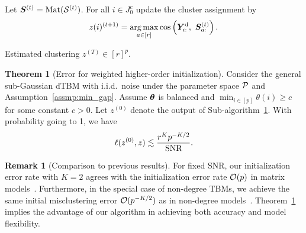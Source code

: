 \documentclass[lettersize,onecolumn,journal]{IEEEtran}
\theoremstyle{definition}
\newtheorem{thm}{Theorem}
\theoremstyle{definition}
\newtheorem{rmk}{Remark}
\newcommand{\of}[1]{\left(#1\right)}
\def\fixme#1#2{\textbf{\color{red}[FIXME (#1): #2]}}
\begin{document}
\begin{algorithm}[h!]
\begin{algorithmic}[1]
\State Let $\bm S^{(t)} = \text{Mat}(\mathcal{S}^{(t)})$. For all $i \in J_0^c$ update the cluster assignment by
\begin{equation}
    z(i)^{(t+1)} = \operatorname*{arg\,max}_{a \in [r]} \cos \left( \bm Y^{\text{d}}_{i:},\ \bm S^{(t)}_{a:} \right).
\end{equation}

\EndFor

\OUTPUT Estimated clustering $z^{(T)}  \in [r]^{p}$.

\end{algorithmic}
\end{algorithm}


\begin{thm}[Error for weighted higher-order initialization]\label{thm:initial} Consider the general {\color{blue} sub-Gaussian} dTBM {\color{blue} with i.i.d.\ noise} under the parameter space $\mathcal{P}$ and Assumption~\ref{assmp:min_gap}. 
Assume $\boldsymbol{\theta}$ is balanced and $\min_{i\in[p]}\theta(i) \geq c$ for some constant $c>0$. Let $ z^{(0)}$ denote the output of Sub-algorithm~\hyperref[alg:main]{1}. With probability going to 1, we have
\begin{equation}\label{eq:ini}
   \ell(z^{(0)}, z) \lesssim {r^K p^{-K/2}\over \text{SNR}}. 
\end{equation}
\end{thm}

\begin{rmk}[Comparison to previous results] For fixed SNR, our initialization error rate with $K=2$ agrees with the initialization error rate $\mathcal{O}(p)$ in matrix models~\citep{gao2018community}. Furthermore, in the special case of non-degree TBMs, we achieve the same initial misclustering error $\mathcal{O}(p^{-K/2})$ as in non-degree models~\citep{han2020exact}. Theorem~\ref{thm:initial} implies the advantage of our algorithm in achieving both accuracy and model flexibility. 
\end{rmk}
\end{document}
